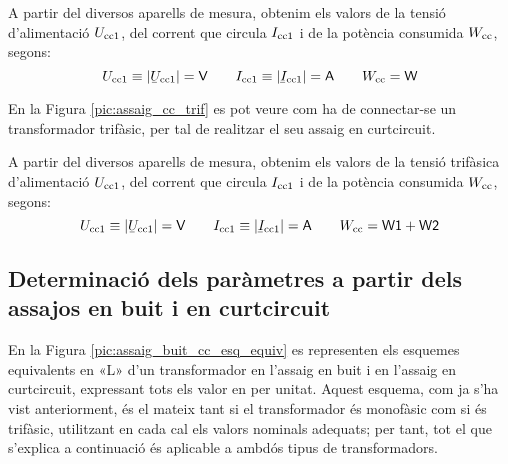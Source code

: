 A partir del diversos aparells de mesura, obtenim els valors de la
tensió d'alimentació $U_\mathrm{cc1}$, del corrent que circula
$I_\mathrm{cc1}$ i de la potència consumida $W_\mathrm{cc}$, segons:
\begin{equation}
    U\ped{cc1}\equiv|\cmplx{U}\ped{cc1}|=\textsf{V} \qquad
    I\ped{cc1}\equiv|\cmplx{I}\ped{cc1}|=\textsf{A}
     \qquad W\ped{cc}=\textsf{W}
\end{equation}

En la Figura \vref{pic:assaig_cc_trif} es pot veure com ha de
connectar-se un transformador trifàsic, per tal de realitzar el seu
assaig en curtcircuit.

\begin{center}
    
    \label{pic:assaig_cc_trif}
\end{center}


A partir del diversos aparells de mesura, obtenim els valors de la
tensió trifàsica d'alimentació $U_\mathrm{cc1}$, del corrent que circula
$I_\mathrm{cc1}$ i de la potència consumida $W_\mathrm{cc}$, segons:
\begin{equation}
    U\ped{cc1}\equiv|\cmplx{U}\ped{cc1}|=\textsf{V} \qquad
    I\ped{cc1}\equiv|\cmplx{I}\ped{cc1}|=\textsf{A} \qquad
    W\ped{cc}=\textsf{W1}+\textsf{W2}
\end{equation}

\subsection{Determinació dels paràmetres a partir dels assajos en buit i en curtcircuit}

En la Figura \vref{pic:assaig_buit_cc_esq_equiv}  es representen els
esquemes equivalents en «L» d'un transformador en l'assaig en buit i
en l'assaig en curtcircuit, expressant tots els valor en per unitat.
Aquest esquema, com ja s'ha vist anteriorment, és el mateix tant si
el transformador és monofàsic com si és trifàsic, utilitzant en cada
cal els valors nominals adequats; per tant, tot el que s'explica  a
continuació és aplicable a ambdós tipus de transformadors.

\begin{center}
    
     \label{pic:assaig_buit_cc_esq_equiv}
\end{center}


